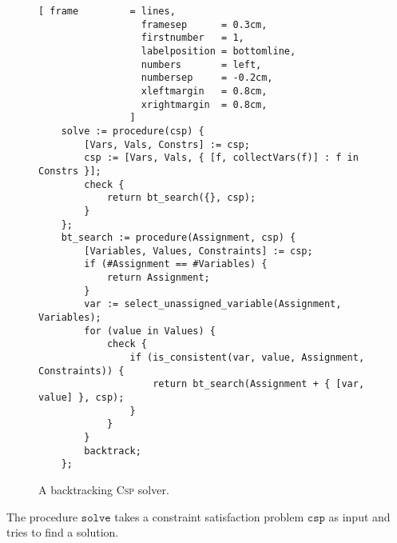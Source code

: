 \begin{figure}[!ht]
\centering
\begin{Verbatim}[ frame         = lines, 
                  framesep      = 0.3cm, 
                  firstnumber   = 1,
                  labelposition = bottomline,
                  numbers       = left,
                  numbersep     = -0.2cm,
                  xleftmargin   = 0.8cm,
                  xrightmargin  = 0.8cm,
                ]
    solve := procedure(csp) {
        [Vars, Vals, Constrs] := csp;
        csp := [Vars, Vals, { [f, collectVars(f)] : f in Constrs }];
        check {
            return bt_search({}, csp);
        }
    };
    bt_search := procedure(Assignment, csp) {
        [Variables, Values, Constraints] := csp;
        if (#Assignment == #Variables) {
            return Assignment;
        }
        var := select_unassigned_variable(Assignment, Variables);
        for (value in Values) {
            check {
                if (is_consistent(var, value, Assignment, Constraints)) {
                    return bt_search(Assignment + { [var, value] }, csp);
                }
            }
        }
        backtrack;
    };
\end{Verbatim}
\vspace*{-0.3cm}
\caption{A backtracking \textsc{Csp} solver.}
\label{fig:csp-backtrack-solver.stlx-1}
\end{figure}
The procedure $\mathtt{solve}$ takes a constraint satisfaction problem $\mathtt{csp}$ as input and tries to
find a solution.  
